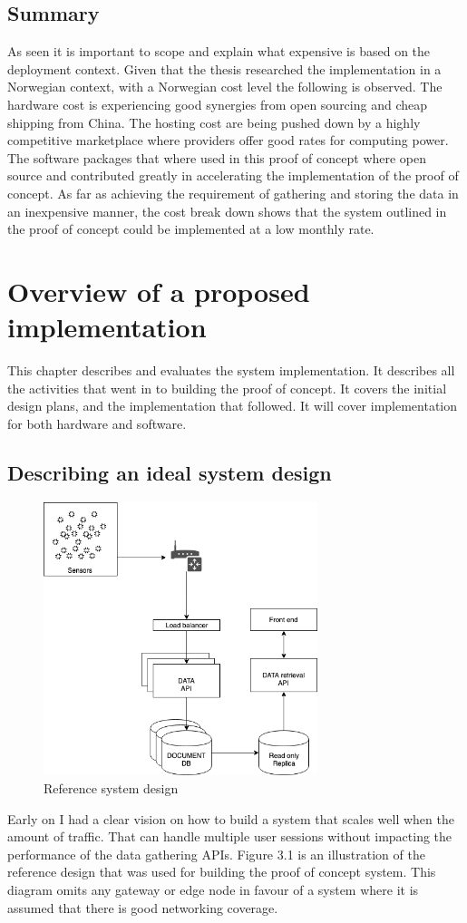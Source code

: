 \documentclass[]{uiophd}
\begin{document}
\section{Summary}
As seen it is important to scope and explain what expensive is based on the deployment context. Given that the thesis researched the implementation in a Norwegian context, with a Norwegian cost level the following is observed. The hardware cost is experiencing good synergies from open sourcing and cheap shipping from China. The hosting cost are being pushed down by a highly competitive marketplace where providers offer good rates for computing power. The software packages that where used in this proof of concept where open source and contributed greatly in accelerating the implementation of the proof of concept. As far as achieving the requirement of gathering and storing the data in an inexpensive manner, the cost break down shows that the system outlined in the proof of concept could be implemented at a low monthly rate.


\chapter{Overview of a proposed implementation}

This chapter describes and evaluates the system implementation. It describes all the activities that went in to building the proof of concept. It covers the initial design plans, and the implementation that followed. It will cover implementation for both hardware and software.

\section{Describing an ideal system design}
\begin{figure}[h]
\caption{Reference system design}
\centering
\includegraphics[width=8cm]{ideal_system_design.png}

\end{figure}
Early on I had a clear vision on how to build a system that scales well when the amount of traffic. That can handle multiple user sessions without impacting the performance of the data gathering APIs. Figure 3.1 is an illustration of the reference design that was used for building the proof of concept system. This diagram omits any gateway or edge node in favour of a system where it is assumed that there is good networking coverage.
\\\\
\end{document}
